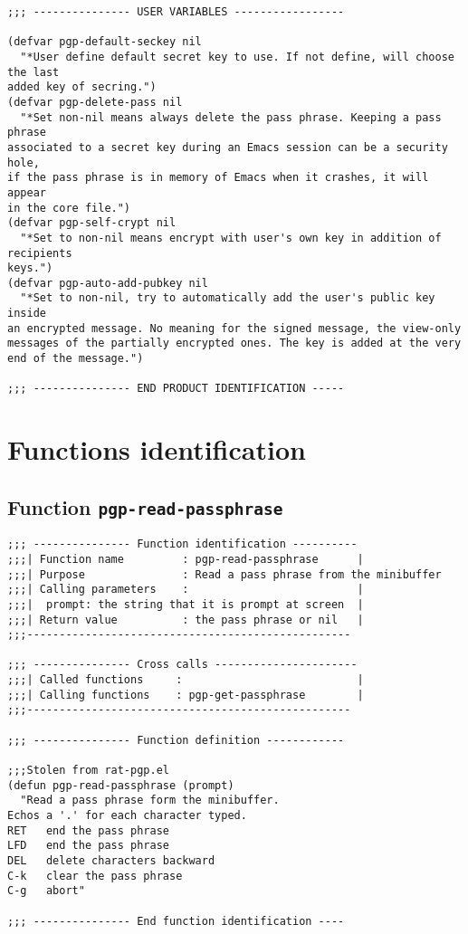 \begin{verbatim}
;;; --------------- USER VARIABLES -----------------

(defvar pgp-default-seckey nil
  "*User define default secret key to use. If not define, will choose the last
added key of secring.")
(defvar pgp-delete-pass nil
  "*Set non-nil means always delete the pass phrase. Keeping a pass phrase 
associated to a secret key during an Emacs session can be a security hole, 
if the pass phrase is in memory of Emacs when it crashes, it will appear 
in the core file.")
(defvar pgp-self-crypt nil
  "*Set to non-nil means encrypt with user's own key in addition of recipients
keys.")
(defvar pgp-auto-add-pubkey nil
  "*Set to non-nil, try to automatically add the user's public key inside
an encrypted message. No meaning for the signed message, the view-only 
messages of the partially encrypted ones. The key is added at the very
end of the message.")

;;; --------------- END PRODUCT IDENTIFICATION -----
\end{verbatim}
\section{Functions identification}
\subsection{Function {\tt pgp-read-passphrase}}
\leavevmode
\begin{verbatim}
;;; --------------- Function identification ----------
;;;| Function name         : pgp-read-passphrase      |
;;;| Purpose               : Read a pass phrase from the minibuffer
;;;| Calling parameters    :                          |
;;;|  prompt: the string that it is prompt at screen  |
;;;| Return value          : the pass phrase or nil   |
;;;--------------------------------------------------

;;; --------------- Cross calls ----------------------
;;;| Called functions     :                           |
;;;| Calling functions    : pgp-get-passphrase        |
;;;-------------------------------------------------- 

;;; --------------- Function definition ------------

;;;Stolen from rat-pgp.el
(defun pgp-read-passphrase (prompt)
  "Read a pass phrase form the minibuffer. 
Echos a '.' for each character typed. 
RET   end the pass phrase
LFD   end the pass phrase
DEL   delete characters backward
C-k   clear the pass phrase
C-g   abort"

;;; --------------- End function identification ----
\end{verbatim}
